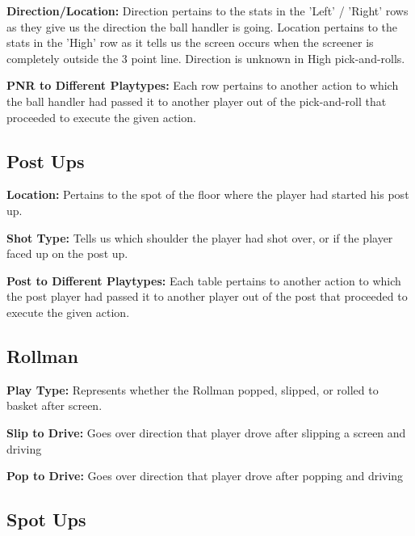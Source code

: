 \documentclass[a4paper,12pt]{article}
\begin{document}
    \noindent \textbf{Direction/Location:} Direction pertains to the stats in the 'Left' / 'Right' rows as they give us the direction the ball handler is going. Location pertains to the stats in the 'High' row as it tells us the screen occurs when the screener is completely outside the 3 point line. Direction is unknown in High pick-and-rolls.
    
    \noindent \textbf{PNR to Different Playtypes:} Each row pertains to another action to which the ball handler had passed it to another player out of the pick-and-roll that proceeded to execute the given action.

\vspace{.5em}

\subsection*{Post Ups}

    \noindent \textbf{Location:} Pertains to the spot of the floor where the player had started his post up. 
    
    \noindent \textbf{Shot Type:} Tells us which shoulder the player had shot over, or if the player faced up on the post up. 
    
    \noindent \textbf{Post to Different Playtypes:} Each table pertains to another action to which the post player had passed it to another player out of the post that proceeded to execute the given action.

\vspace{.5em}

\subsection*{Rollman}

    \noindent \textbf{Play Type:} Represents whether the Rollman popped, slipped, or rolled to basket after screen.
    
    \noindent \textbf{Slip to Drive:} Goes over direction that player drove after slipping a screen and driving

     \noindent \textbf{Pop to Drive:} Goes over direction that player drove after popping and driving

\vspace{.5em}


\subsection*{Spot Ups}
\end{document}
